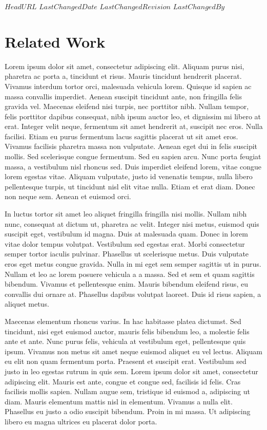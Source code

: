 \svnidlong
{$HeadURL$}
{$LastChangedDate$}
{$LastChangedRevision$}
{$LastChangedBy$}

\chapter{Related Work}
Lorem ipsum dolor sit amet, consectetur adipiscing elit.
Aliquam purus nisi, pharetra ac porta a, tincidunt et risus.
Mauris tincidunt hendrerit placerat.
Vivamus interdum tortor orci, malesuada vehicula lorem.
Quisque id sapien ac massa convallis imperdiet.
Aenean suscipit tincidunt ante, non fringilla felis gravida vel.
Maecenas eleifend nisi turpis, nec porttitor nibh.
Nullam tempor, felis porttitor dapibus consequat, nibh ipsum auctor leo, et dignissim mi libero at erat.
Integer velit neque, fermentum sit amet hendrerit at, suscipit nec eros.
Nulla facilisi.
Etiam eu purus fermentum lacus sagittis placerat ut sit amet eros.
Vivamus facilisis pharetra massa non vulputate.
Aenean eget dui in felis suscipit mollis.
Sed scelerisque congue fermentum.
Sed eu sapien arcu.
Nunc porta feugiat massa, a vestibulum nisl rhoncus sed.
Duis imperdiet eleifend lorem, vitae congue lorem egestas vitae.
Aliquam vulputate, justo id venenatis tempus, nulla libero pellentesque turpis, ut tincidunt nisl elit vitae nulla.
Etiam et erat diam.
Donec non neque sem.
Aenean et euismod orci.

In luctus tortor sit amet leo aliquet fringilla fringilla nisi mollis.
Nullam nibh nunc, consequat at dictum ut, pharetra ac velit.
Integer nisi metus, euismod quis suscipit eget, vestibulum id magna.
Duis at malesuada quam.
Donec in lorem vitae dolor tempus volutpat.
Vestibulum sed egestas erat.
Morbi consectetur semper tortor iaculis pulvinar.
Phasellus ut scelerisque metus.
Duis vulputate eros eget metus congue gravida.
Nulla in mi eget sem semper sagittis ut in purus.
Nullam et leo ac lorem posuere vehicula a a massa.
Sed et sem et quam sagittis bibendum.
Vivamus et pellentesque enim.
Mauris bibendum eleifend risus, eu convallis dui ornare at.
Phasellus dapibus volutpat laoreet.
Duis id risus sapien, a aliquet metus.

Maecenas elementum rhoncus varius.
In hac habitasse platea dictumst.
Sed tincidunt, nisi eget euismod auctor, mauris felis bibendum leo, a molestie felis ante et ante.
Nunc purus felis, vehicula at vestibulum eget, pellentesque quis ipsum.
Vivamus non metus sit amet neque euismod aliquet eu vel lectus.
Aliquam eu elit non quam fermentum porta.
Praesent et suscipit erat.
Vestibulum sed justo in leo egestas rutrum in quis sem.
Lorem ipsum dolor sit amet, consectetur adipiscing elit.
Mauris est ante, congue et congue sed, facilisis id felis.
Cras facilisis mollis sapien.
Nullam augue sem, tristique id euismod a, adipiscing ut diam.
Mauris elementum mattis nisl in elementum.
Vivamus a nulla elit.
Phasellus eu justo a odio suscipit bibendum.
Proin in mi massa.
Ut adipiscing libero eu magna ultrices eu placerat dolor porta.

